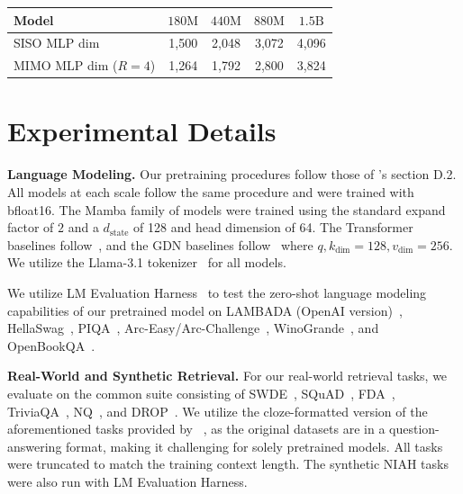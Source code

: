 \documentclass{article}
\newcommand{\citep}{\parencite}
\newcommand{\citet}{\textcite}
\theoremstyle{plain}
\theoremstyle{definition}
\theoremstyle{remark}
\begin{document}
\begin{table}[h]
    \centering
    \begin{tabular}{lcccc}
        \toprule
        \textbf{Model}& $180\text{M}$ & $440\text{M}$ & $880\text{M}$ & $1.5\text{B}$ \\
        \midrule
        SISO MLP dim & 1,500 & 2,048 & 3,072 & 4,096 \\
        MIMO MLP dim ($R=4$) & 1,264 & 1,792 & 2,800 & 3,824 \\
        \bottomrule
    \end{tabular}
\end{table}

\section{Experimental Details}
\label{app:exp-details}

\textbf{Language Modeling.}
Our pretraining procedures follow those of \citet{dao2024transformersssmsgeneralizedmodels}'s section D.2. All models at each scale follow the same procedure and were trained with bfloat16. The Mamba family of models were trained using the standard expand factor of $2$ and a $d_\text{state}$ of 128 and head dimension of 64. The Transformer baselines follow~\citet{dao2024transformersssmsgeneralizedmodels}, and the GDN baselines follow~\citep{yang2025gateddeltanetworksimproving} where $q,k_\text{dim}=128,v_\text{dim}=256$. We utilize the Llama-3.1 tokenizer~\citep{grattafiori2024llama3herdmodels} for all models.

We utilize LM Evaluation Harness~\citep{eval-harness} to test the zero-shot language modeling capabilities of our pretrained model on LAMBADA (OpenAI version)~\citep{paperno2016lambadadatasetwordprediction}, HellaSwag~\citep{zellers2019hellaswagmachinereallyfinish}, PIQA~\citep{bisk2019piqareasoningphysicalcommonsense}, Arc-Easy/Arc-Challenge~\citep{clark2018thinksolvedquestionanswering}, WinoGrande~\citep{sakaguchi2019winograndeadversarialwinogradschema}, and OpenBookQA~\citep{mihaylov2018suitarmorconductelectricity}.

\textbf{Real-World and Synthetic Retrieval.}
For our real-world retrieval tasks, we evaluate on the common suite consisting of SWDE~\citep{arora2025simplelinearattentionlanguage}, SQuAD~\citep{Rajpurkar2018SQuAD2}, FDA~\citep{arora2025simplelinearattentionlanguage}, TriviaQA~\citep{joshi2017triviaqalargescaledistantly}, NQ~\citep{kwiatkowski-etal-2019-natural}, and DROP~\citep{dua2019dropreadingcomprehensionbenchmark}. We utilize the cloze-formatted version of the aforementioned tasks provided by ~\citet{arora2025simplelinearattentionlanguage,arora2024justreadtwiceclosing}, as the original datasets are in a question-answering format, making it challenging for solely pretrained models. All tasks were truncated to match the training context length. The synthetic NIAH tasks~\citep{hsieh2024rulerwhatsrealcontext} were also run with LM Evaluation Harness. 
\end{document}
